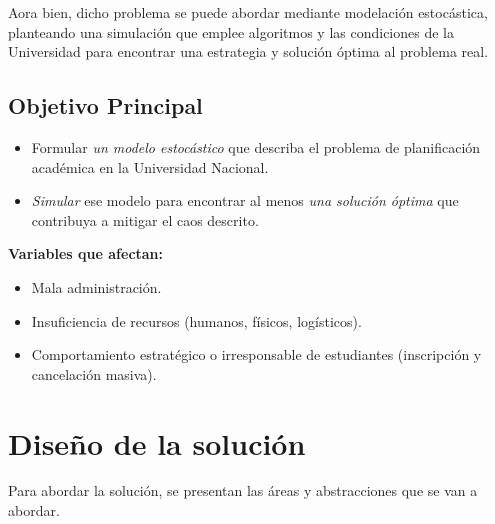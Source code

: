 \documentclass{article}
\begin{document}
Aora bien, dicho problema se puede abordar mediante modelación estocástica, planteando una simulación 
que emplee algoritmos y las condiciones de la Universidad para encontrar una estrategia y solución 
óptima al problema real.

\subsection{Objetivo Principal}

\begin{itemize}
  \item Formular \textit{un modelo estocástico} que describa el problema de planificación académica 
        en la Universidad Nacional.
  \item \textit{Simular} ese modelo para encontrar al menos \textit{una solución óptima} 
        que contribuya a mitigar el caos descrito.
\end{itemize}

\textbf{Variables que afectan:}

\begin{itemize}
  \item Mala administración.
  \item Insuficiencia de recursos (humanos, físicos, logísticos).
  \item Comportamiento estratégico o irresponsable de estudiantes (inscripción y cancelación masiva).
\end{itemize}


\section{Diseño de la solución}\label{sec:dis}

Para abordar la solución, se presentan las áreas y abstracciones que se van a abordar.
\end{document}
